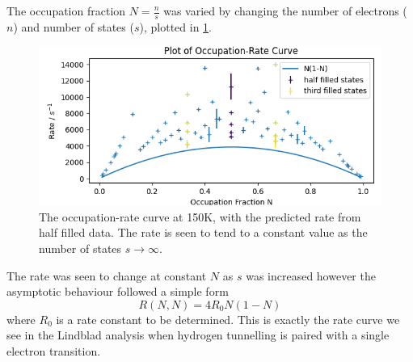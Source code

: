 The occupation fraction
\(N = \frac{n}{s}\) was
varied by changing the
number of electrons (\(n\))
and number of states (\(s\)),
plotted in
\cref{fig:occupation rate curve}.
\begin{figure}
    \centering
    \includegraphics[width=0.7\linewidth]{Figures/Simulation/Occupation Rate Curve.png}
    \caption{The occupation-rate curve
        at 150K, with the predicted rate from half
        filled data. The rate is seen to
        tend to a constant
        value as the number of states
        \(s\rightarrow{}\infty{}\).
    }\label{fig:occupation rate curve}
\end{figure}
The rate was seen to change
at constant \(N\) as \(s\) was
increased however the asymptotic
behaviour followed a simple form
\begin{equation}
    R(N,N) = 4 R_0 N(1-N)\label{eqn:degenerate tunnelling rate}
\end{equation}
where \(R_0\) is a
rate constant to be determined.
This is exactly the rate curve
we see in the Lindblad
analysis when hydrogen tunnelling
is paired with a single
electron transition.

